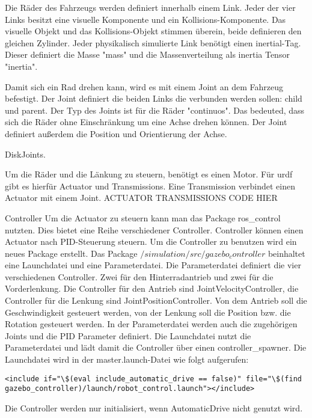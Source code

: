 Die Räder des Fahrzeugs werden definiert innerhalb einem Link.
Jeder der vier Links besitzt eine visuelle Komponente und ein Kollisions-Komponente.
Das visuelle Objekt und das Kollisions-Objekt stimmen überein, beide definieren den gleichen Zylinder.
Jeder physikalisch simulierte Link benötigt einen inertial-Tag.
Dieser definiert die Masse "mass" und die Massenverteilung als inertia Tensor "inertia".

Damit sich ein Rad drehen kann, wird es mit einem Joint an dem Fahrzeug befestigt.
Der Joint definiert die beiden Links die verbunden werden sollen: child und parent.
Der Typ des Joints ist für die Räder "continuos". Das bedeuted, dass sich die Räder ohne Einschränkung um eine Achse drehen können.
Der Joint definiert außerdem die Position und Orientierung der Achse.

DiskJoints.

Um die Räder und die Länkung zu steuern, benötigt es einen Motor. 
Für urdf gibt es hierfür Actuator und Transmissions.
Eine Transmission verbindet einen Actuator mit einem Joint. 
ACTUATOR TRANSMISSIONS CODE HIER

Controller
Um die Actuator zu steuern kann man das Package ros\_control nutzten.
Dies bietet eine Reihe verschiedener Controller.
Controller können einen Actuator nach PID-Steuerung steuern.
Um die Controller zu benutzen wird ein neues Package erstellt.
Das Package $/simulation/src/gazebo_controller$ beinhaltet eine Launchdatei und eine Parameterdatei.
Die Parameterdatei definiert die vier verschiedenen Controller.
Zwei für den Hinterradantrieb und zwei für die Vorderlenkung.
Die Controller für den Antrieb sind JointVelocityController, die Controller für die Lenkung sind JointPositionController.
Von dem Antrieb soll die Geschwindigkeit gesteuert werden, von der Lenkung soll die Position bzw. die Rotation gesteuert werden.
In der Parameterdatei werden auch die zugehörigen Joints und die PID Parameter definiert.
Die Launchdatei nutzt die Parameterdatei und lädt damit die Controller über einen controller\_spawner.
Die Launchdatei wird in der master.launch-Datei wie folgt aufgerufen:
\begin{lstlisting}
<include if="\$(eval include_automatic_drive == false)" file="\$(find gazebo_controller)/launch/robot_control.launch"></include>
\end{lstlisting}
Die Controller werden nur initialisiert, wenn AutomaticDrive nicht genutzt wird.

